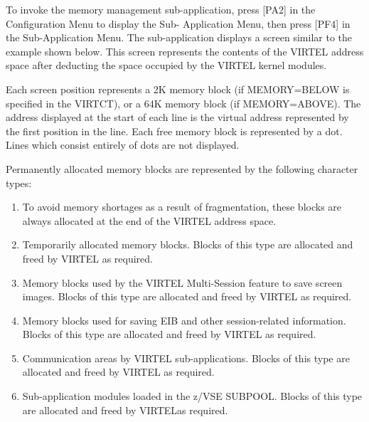 \documentclass[letterpaper,10pt,english]{sphinxmanual}
\begin{document}
To invoke the memory management sub-application, press {[}PA2{]} in the Configuration Menu to display the Sub- Application Menu, then press {[}PF4{]} in the Sub-Application Menu. The sub-application displays a screen similar to the example shown below. This screen represents the contents of the VIRTEL address space after deducting the space  occupied by the VIRTEL kernel modules.



Each screen position represents a 2K memory block (if MEMORY=BELOW is specified in the VIRTCT), or a 64K memory block (if MEMORY=ABOVE). The address displayed at the start of each line is the virtual address represented by the first position in the line. Each free memory block is represented by a dot. Lines which consist entirely of dots are not displayed.

Permanently allocated memory blocks are represented by the following character types:
\begin{enumerate}
\def\theenumi{\arabic{enumi}}
\def\labelenumi{\theenumi .}
\makeatletter\def\p@enumii{\p@enumi \theenumi .}\makeatother
\item {} 
To avoid memory shortages as a result of fragmentation, these blocks are always allocated at the end of the VIRTEL address space.

\item {} 
Temporarily allocated memory blocks. Blocks of this type are allocated and freed by VIRTEL as required.

\item {} 
Memory blocks used by the VIRTEL Multi-Session feature to save screen images. Blocks of this type are allocated and freed by VIRTEL as required.

\item {} 
Memory blocks used for saving EIB and other session-related information. Blocks of this type are allocated and freed by VIRTEL as required.

\item {} 
Communication areas by VIRTEL sub-applications. Blocks of this type are allocated and freed by VIRTEL as required.

\item {} 
Sub-application modules loaded in the z/VSE SUBPOOL. Blocks of this type are allocated and freed by VIRTELas required.

\end{enumerate}
\end{document}
